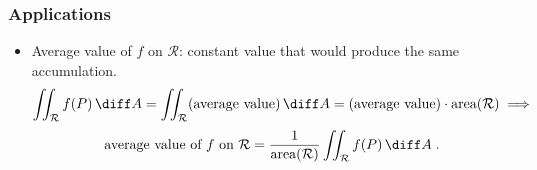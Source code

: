 \begin{frame}
\frametitle{Applications}
\begin{itemize}
\item Average value of $f$ on $\mathcal{R}$: constant value that would produce the same accumulation.
\[
\iint _{\mathcal{R}} f(P) \, \diff A =
\iint_{\mathcal{R}} (\text{average value}) \, \diff A =  (\text{average value})
\cdot \text{area}(\mathcal{R}) \; \Longrightarrow 
\]
\[
\text{average value of }f \text{ on } \mathcal{R} = \frac{1}{\text{area}(\mathcal{R})} \iint_{\mathcal{R}} f(P) \, \diff A\; .
\]
\end{itemize}
\end{frame}